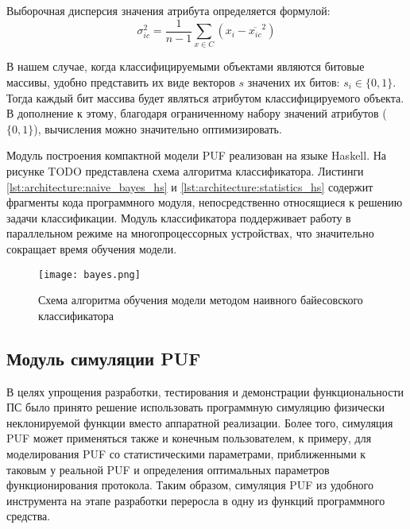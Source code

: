Выборочная дисперсия значения атрибута определяется формулой:
\begin{equation}
  \label{eq:architecture:dispersion}
  \sigma_{ic}^2 = \frac{1}{n - 1} \sum\limits_{x \in C} (x_i - \overline{x_{ic}}^2)
\end{equation}

В нашем случае, когда классифицируемыми объектами являются битовые массивы, удобно представить их виде векторов $s$ значених их битов: $s_i \in \{0, 1\}$. Тогда каждый бит массива будет являться атрибутом классифицируемого объекта. В дополнение к этому, благодаря ограниченному набору значений атрибутов ($\{0, 1\}$), вычисления можно значительно оптимизировать.

Модуль построения компактной модели PUF реализован на языке Haskell. На рисунке TODO представлена схема алгоритма классификатора. Листинги \ref{lst:architecture:naive_bayes_hs} и \ref{lst:architecture:statistics_hs} содержит фрагменты кода программного модуля, непосредственно относящиеся к решению задачи классификации. Модуль классификатора поддерживает работу в параллельном режиме на многопроцессорных устройствах, что значительно сокращает время обучения модели.






\begin{figure}[!h]
    \centering
    \texttt{[image: bayes.png]}
    \caption{Схема алгоритма обучения модели методом наивного байесовского классификатора}
    \label{fig:architecture:bayes}
\end{figure}

\subsection{Модуль симуляции PUF}
В целях упрощения разработки, тестирования и демонстрации функциональности ПС было принято решение использовать программную симуляцию физически неклонируемой функции вместо аппаратной реализации. Более того, симуляция PUF может применяться также и конечным пользователем, к примеру, для моделирования PUF со статистическими параметрами, приближенными к таковым у реальной PUF и определения оптимальных параметров функционирования протокола. Таким образом, симуляция PUF из удобного инструмента на этапе разработки переросла в одну из функций программного средства.

